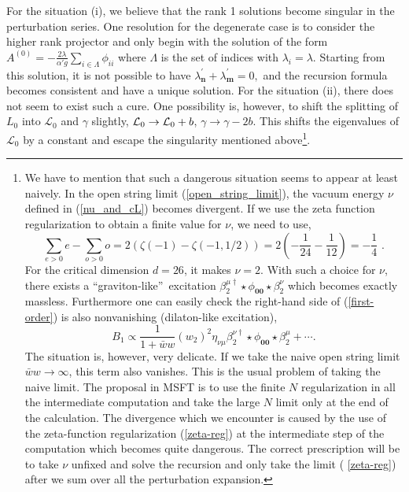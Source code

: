 \documentclass[a4paper,aps,preprint,nofootinbib,eqsecnum]{revtex4}
\begin{document}
For the situation (i), we believe that the rank 1 solutions become singular
in the perturbation series. One resolution for the degenerate case is to
consider the higher rank projector and only begin with the solution of the
form $A^{\left( 0\right) }=-\frac{2\lambda}{\alpha' g}
\sum_{i\in \Lambda }\phi _{ii}$ where $%
\Lambda $ is the set of indices with $\lambda _{i}=\lambda $. Starting from
this solution, it is not possible to have $\lambda _{\mathbf{n}}^{\prime
}+\lambda _{\mathbf{m}}^{\prime }=0,$ and the recursion formula becomes
consistent and have a unique solution. For the situation (ii), there does
not seem to exist such a cure. One possibility is, however, to shift the
splitting of $L_{0}$ into ${\mathcal{L}_{0}}$ and $\gamma $ slightly, ${%
\mathcal{L}_{0}}\rightarrow {\mathcal{L}_{0}}+b$, $\gamma \rightarrow \gamma
-2b$. This shifts the eigenvalues of ${\mathcal{L}_{0}}$ by a constant and
escape the singularity mentioned above\footnote{%
We have to mention that such a dangerous situation seems to appear at least
naively. In the open string limit (\ref{open_string_limit}), the vacuum
energy $\nu $ defined in (\ref{nu_and_cL}) becomes divergent. If we use the
zeta function regularization to obtain a finite value for $\nu $, we need to
use,
\begin{equation}
\sum_{e>0}e-\sum_{o>0}o=2(\zeta (-1)-\zeta (-1,1/2))=2\left( -\frac{1}{24}-%
\frac{1}{12}\right) =-\frac{1}{4}\,\,.  \label{zeta-reg}
\end{equation}%
For the critical dimension $d=26$, it makes $\nu =2$. With such a choice for
$\nu $, there exists a \textquotedblleft graviton-like\textquotedblright\
excitation $\beta _{2}^{\mu \dagger }\star \phi _{\mathbf{00}}\star \beta
_{2}^{\nu }$ which becomes exactly massless. Furthermore one can easily
check the right-hand side of (\ref{first-order}) is also nonvanishing
(dilaton-like excitation),
\begin{equation}
B_{1}\propto \frac{1}{1+\bar{w}w}(w_{2})^{2}\eta _{\nu \mu }\beta _{2}^{\nu
\dagger }\star \phi _{\mathbf{00}}\star \beta _{2}^{\mu }+\cdots .
\end{equation}%
The situation is, however, very delicate. If we take the naive open string
limit $\bar{w}w\rightarrow \infty $, this term also vanishes. This is the
usual problem of taking the naive limit. The proposal in MSFT \cite{BM1}\cite%
{BM2}\cite{BKM1} is to use the finite $N$ regularization in all the
intermediate computation and take the large $N$ limit only at the end of the
calculation. The divergence which we encounter is caused by the use of the
zeta-function regularization (\ref{zeta-reg}) at the intermediate step of
the computation which becomes quite dangerous. The correct prescription will
be to take $\nu $ unfixed and solve the recursion and only take the limit (%
\ref{zeta-reg}) after we sum over all the perturbation expansion.}.
\end{document}
